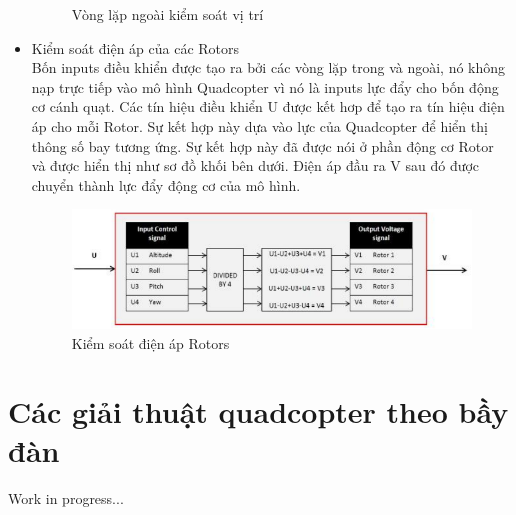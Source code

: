 \begin{itemize}
\begin{figure}[h!]
\begin{center}
	        		\caption{Vòng lặp ngoài kiểm soát vị trí}
	        	\end{center}
        \end{figure}
			\item Kiểm soát điện áp của các Rotors
			\\
			Bốn inputs điều khiển được tạo ra bởi các vòng lặp trong và ngoài, nó không nạp trực tiếp vào mô hình Quadcopter vì nó là inputs lực đẩy cho bốn động cơ cánh quạt. Các tín hiệu điều khiển U được kết hơp để tạo ra tín hiệu điện áp cho mỗi Rotor. Sự kết hợp này dựa vào lực của Quadcopter để hiển thị thông số bay tương ứng. Sự kết hợp này đã được nói ở phần động cơ Rotor và được hiển thị như sơ đồ khối bên dưới. Điện áp đầu ra V sau đó được chuyển thành lực đẩy động cơ của mô hình.
  \\
  \begin{figure}[h!]
	        	\begin{center}
	        		\includegraphics[scale=0.8]{images/Cuong-VolControl.png}
	        		\caption{Kiểm soát điện áp Rotors}
	        	\end{center}
        \end{figure}
			\end{itemize}
			\section{Các giải thuật quadcopter theo bầy đàn}
			Work in progress...